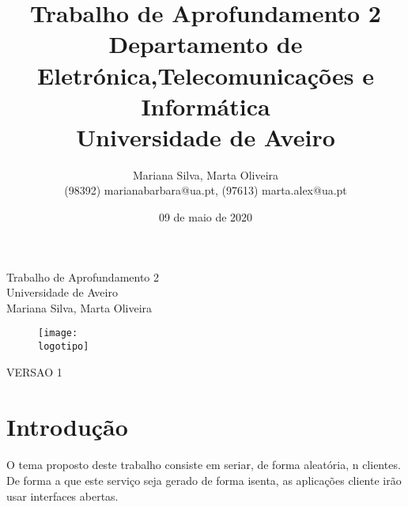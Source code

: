 \documentclass[a4paper,11pt,onecolumn,oneside]{article}
\begin{document}
%
\def\titulo{Trabalho de Aprofundamento 2}
\def\data{09 de maio de 2020}
\def\autores{Mariana Silva, Marta Oliveira}
\def\autorescontactos{(98392) marianabarbara@ua.pt, (97613) marta.alex@ua.pt}
\def\versao{VERSAO 1}
\def\departamento{Departamento de Eletrónica,Telecomunicações e Informática }
\def\empresa{Universidade de Aveiro}
\def\logotipo{ua.pdf}

%
%
\begin{titlepage}

\begin{center}
%
\vspace*{50mm}
%
{\Huge \titulo}\\ 
%
\vspace{10mm}
%
{\Large \empresa}\\
%
\vspace{10mm}
%
{\LARGE \autores}\\ 
%
\vspace{30mm}
%
\begin{figure}[h]
\center
\texttt{[image: \\logotipo]}
\end{figure}
%
\vspace{30mm}
\end{center}
%
\begin{flushright}
\versao
\end{flushright}
\end{titlepage}

\title{%
{\Huge\textbf{\titulo}}\\
\vspace{10mm}
{\Large \departamento\\ \empresa}
}
%
\author{%
    \autores \\
    \autorescontactos
}
%
\date{\data}
%
\maketitle


\clearpage
{}

\newpage

{\center \tableofcontents}     
{\center \listoffigures}  

\newpage

{\center \section{Introdução}}
\paragraph{ }
O tema proposto deste trabalho consiste em seriar, de forma aleatória, n clientes. De forma a que este serviço seja gerado de forma isenta, as aplicações cliente irão usar interfaces abertas.
\end{document}
